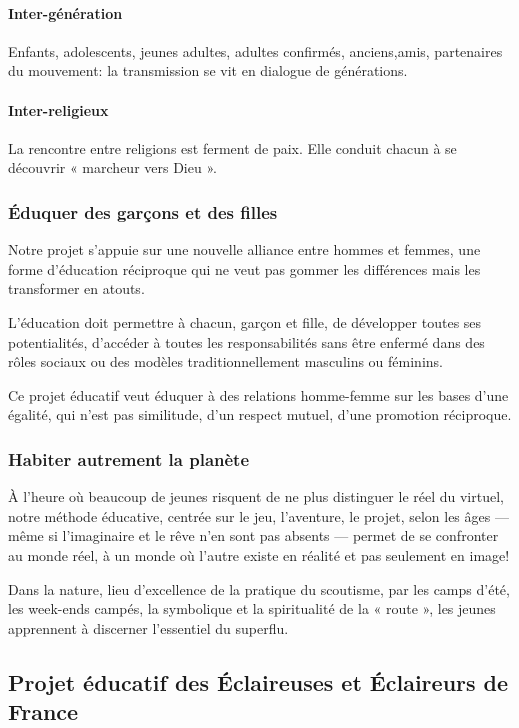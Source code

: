 \documentclass[titlepage,11pt,a4paper]{article}
\begin{document}
\paragraph{Inter-génération} Enfants, adolescents, jeunes adultes, adultes confirmés, anciens,amis,
partenaires du mouvement: la transmission se vit en dialogue de générations.

\paragraph{Inter-religieux} La rencontre entre religions est ferment de paix. Elle conduit chacun à
se découvrir « marcheur vers Dieu ».

\subsubsection*{Éduquer des garçons et des filles}

Notre projet s’appuie sur une nouvelle alliance entre hommes et femmes, une forme
d’éducation réciproque qui ne veut pas gommer les différences mais les transformer en
atouts.

L’éducation doit permettre à chacun, garçon et fille, de développer toutes ses
potentialités, d’accéder à toutes les responsabilités sans être enfermé dans des rôles
sociaux ou des modèles traditionnellement masculins ou féminins.

Ce projet éducatif veut éduquer à des relations homme-femme sur les bases d’une égalité,
qui n’est pas similitude, d’un respect mutuel, d’une promotion réciproque.

\subsubsection*{Habiter autrement la planète}

À l’heure où beaucoup de jeunes risquent de ne plus distinguer le réel du virtuel, notre
méthode éducative, centrée sur le jeu, l’aventure, le projet, selon les âges — même si
l’imaginaire et le rêve n’en sont pas absents — permet de se confronter au monde réel, à
un monde où l’autre existe en réalité et pas seulement en image!

Dans la nature, lieu d’excellence de la pratique du scoutisme, par les camps d’été, les
week-ends campés, la symbolique et la spiritualité de la « route », les jeunes apprennent
à discerner l’essentiel du superflu.

\clearpage
\subsection{\label{peeedf}Projet éducatif des Éclaireuses et Éclaireurs de France}
\end{document}
